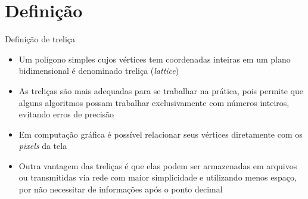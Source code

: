\section{Definição}

\begin{frame}[fragile]{Definição de treliça}

    \begin{itemize}
        \item Um polígono simples cujos vértices tem coordenadas inteiras em um plano 
            bidimensional é denominado treliça ({\it lattice})

        \item As treliças são mais adequadas para se trabalhar na prática, pois permite que
            alguns algoritmos possam trabalhar exclusivamente com números inteiros, 
            evitando erros de precisão

        \item Em computação gráfica é possível relacionar seus vértices diretamente com os
            \textit{pixels} da tela

        \item Outra vantagem das treliças é que elas podem ser armazenadas em arquivos ou
            transmitidas via rede com maior simplicidade e utilizando menos espaço, por
            não necessitar de informações após o ponto decimal
        
    \end{itemize}

\end{frame}
